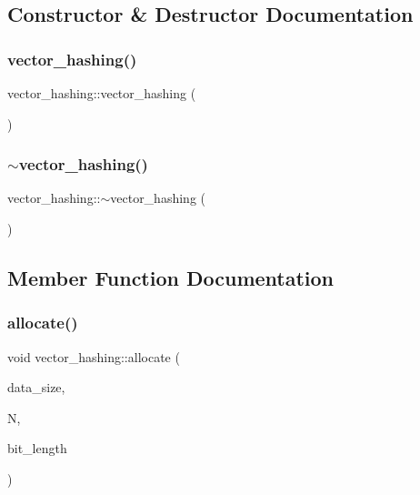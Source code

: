 \subsection{Constructor \& Destructor Documentation}
\mbox{\label{classvector__hashing_af8767f6698600d3345811561be2116ed}} 
\subsubsection{\texorpdfstring{vector\+\_\+hashing()}{vector\_hashing()}}
{\footnotesize\ttfamily vector\+\_\+hashing\+::vector\+\_\+hashing (\begin{DoxyParamCaption}{ }\end{DoxyParamCaption})}

\mbox{\label{classvector__hashing_aa34aecaccd6399ffa4c66d5c12a28ee8}} 
\subsubsection{\texorpdfstring{$\sim$vector\+\_\+hashing()}{~vector\_hashing()}}
{\footnotesize\ttfamily vector\+\_\+hashing\+::$\sim$vector\+\_\+hashing (\begin{DoxyParamCaption}{ }\end{DoxyParamCaption})}



\subsection{Member Function Documentation}
\mbox{\label{classvector__hashing_a1324d458f4b77fce47b0048dc7f1aadd}} 
\subsubsection{\texorpdfstring{allocate()}{allocate()}}
{\footnotesize\ttfamily void vector\+\_\+hashing\+::allocate (\begin{DoxyParamCaption}\item[{\mbox{\hyperlink{galois_8h_a09fddde158a3a20bd2dcadb609de11dc}{I\+NT}}}]{data\+\_\+size,  }\item[{\mbox{\hyperlink{galois_8h_a09fddde158a3a20bd2dcadb609de11dc}{I\+NT}}}]{N,  }\item[{\mbox{\hyperlink{galois_8h_a09fddde158a3a20bd2dcadb609de11dc}{I\+NT}}}]{bit\+\_\+length }\end{DoxyParamCaption})}


